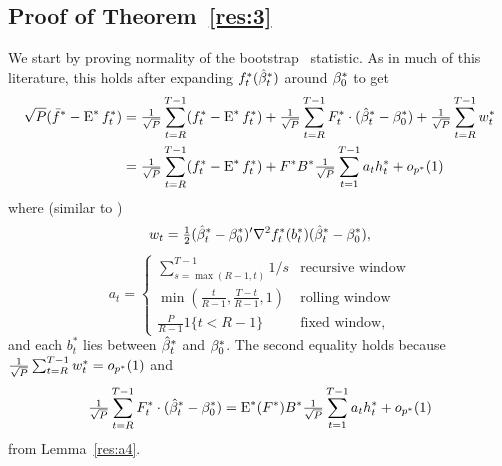 \documentclass[12pt,fleqn]{article}
\begin{document}
\subsection*{Proof of Theorem~\ref{res:3}}
We start by proving normality of the bootstrap \oos\ statistic. As in
much of this literature, this holds after expanding $f_t^{*}(\hat \beta_t^*)$
around $\beta_0^*$ to get
  \begin{align*}
    \sqrt{P} (\bar f^* - \operatorname{E}^* f_t^*)
    &= \tfrac{1}{\sqrt{P}} \sum_{t=R}^{T-1} (f_t^{*} - \operatorname{E}^* f_t^*)
     + \tfrac{1}{\sqrt{P}} \sum_{t=R}^{T-1} F_t^* \cdot (\hat \beta_t^* - \beta_0^*)
     + \tfrac{1}{\sqrt{P}} \sum_{t=R}^{T-1} w_t^* \\
    &= \tfrac{1}{\sqrt{P}} \sum_{t=R}^{T-1} (f_t^{*} - \operatorname{E}^* f_t^*)
     + F^* B^* \tfrac{1}{\sqrt{P}} \sum_{t=1}^{T-1} a_t h_t^* + o_{p^*}(1)
  \end{align*}
  where (similar to \citealp{Wes:96})
  \begin{equation}
    w_{t} = \tfrac12 (\hat \beta_t^* - \beta_0^*)' \nabla^2 f_{t}^*(b_{t}^*) (\hat \beta_t^* - \beta_0^*),
  \end{equation}
  \begin{equation}\label{eq:1}
    a_t =
    \begin{cases}
      \sum_{s=\max(R-1, t)}^{T-1} 1/s & \text{recursive window} \\
      \min(\tfrac{t}{R-1}, \tfrac{T - t}{R-1}, 1) & \text{rolling window} \\
      \tfrac{P}{R-1} 1\{t < R-1\} &  \text{fixed window},
    \end{cases}
  \end{equation}
  and each $b_{t}^*$ lies between $\hat \beta_t^*$ and $\beta_0^*$. The second equality holds because
  $\tfrac{1}{\sqrt{P}} \sum_{t=R}^{T-1} w_t^* = o_{p^*}(1)$ and
  \begin{equation*}
    \tfrac{1}{\sqrt{P}} \sum_{t=R}^{T-1} F_t^* \cdot (\hat \beta_t^* - \beta_0^*)
    = \operatorname{E}^*(F^*) B^* \tfrac{1}{\sqrt{P}} \sum_{t=1}^{T-1} a_t h_t^* + o_{p^*}(1)
  \end{equation*}
  from Lemma~\ref{res:a4}.
\end{document}
